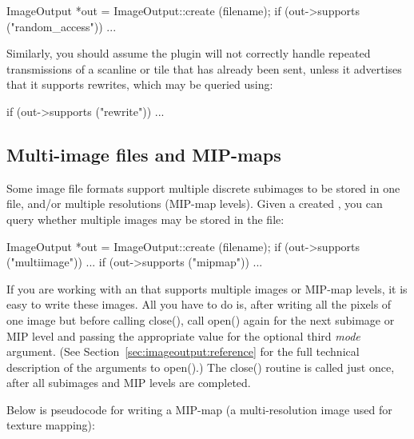\begin{code}
        ImageOutput *out = ImageOutput::create (filename);
        if (out->supports ("random_access"))
            ...
\end{code}

\noindent Similarly, you should assume the plugin will not correctly
handle repeated transmissions of a scanline or tile that has already
been sent, unless it advertises that it supports rewrites, which may be
queried using:

\begin{code}
        if (out->supports ("rewrite"))
            ...
\end{code}


\subsection{Multi-image files and MIP-maps}
\label{sec:imageoutput:multiimage}
\label{sec:imageoutput:mipmap}

Some image file formats support multiple discrete subimages to be stored
in one file, and/or multiple resolutions (MIP-map levels).  Given a
created \ImageOutput, you can query whether multiple images may be
stored in the file:

\begin{code}
        ImageOutput *out = ImageOutput::create (filename);
        if (out->supports ("multiimage"))
            ...
        if (out->supports ("mipmap"))
            ...
\end{code}

If you are working with an \ImageOutput that supports multiple images
or MIP-map levels,
it is easy to write these images.  All you have to do is, after writing
all the pixels of one image but before calling {\cf close()}, call {\cf
  open()} again for the next subimage or MIP level and passing the
appropriate value for the optional third
\emph{mode} argument.  (See
Section~\ref{sec:imageoutput:reference} for the full technical
description of the arguments to {\cf open()}.)  The {\cf close()}
routine is called just once, after all subimages and MIP levels are completed.

Below is pseudocode for writing a MIP-map (a multi-resolution image
used for texture mapping):

